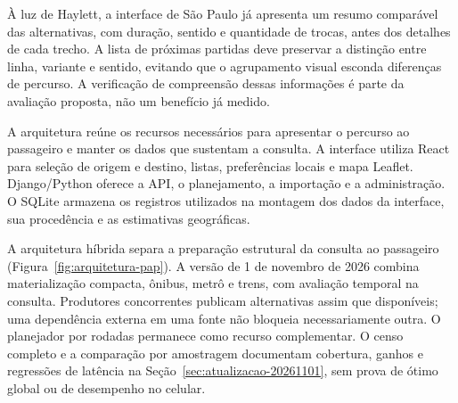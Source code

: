 \documentclass[12pt,oneside,a4paper,brazil,chapter=TITLE]{abntex2}
\begin{document}
À luz de Haylett, a interface de São Paulo já apresenta um resumo comparável das alternativas, com duração, sentido e quantidade de trocas, antes dos detalhes de cada trecho. A lista de próximas partidas deve preservar a distinção entre linha, variante e sentido, evitando que o agrupamento visual esconda diferenças de percurso. A verificação de compreensão dessas informações é parte da avaliação proposta, não um benefício já medido.

A arquitetura reúne os recursos necessários para apresentar o percurso ao passageiro e manter os dados que sustentam a consulta. A interface utiliza React para seleção de origem e destino, listas, preferências locais e mapa Leaflet. Django/Python oferece a API, o planejamento, a importação e a administração. O SQLite armazena os registros utilizados na montagem dos dados da interface, sua procedência e as estimativas geográficas.

A arquitetura híbrida separa a preparação estrutural da consulta ao passageiro (Figura~\ref{fig:arquitetura-pap}). A versão de 1 de novembro de 2026 combina materialização compacta, ônibus, metrô e trens, com avaliação temporal na consulta. Produtores concorrentes publicam alternativas assim que disponíveis; uma dependência externa em uma fonte não bloqueia necessariamente outra. O planejador por rodadas permanece como recurso complementar. O censo completo e a comparação por amostragem documentam cobertura, ganhos e regressões de latência na Seção~\ref{sec:atualizacao-20261101}, sem prova de ótimo global ou de desempenho no celular.
\end{document}
